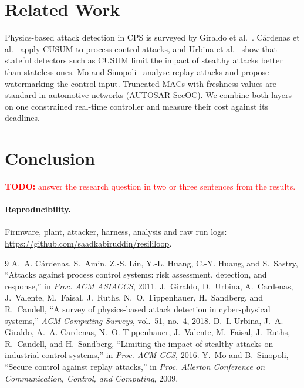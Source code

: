\documentclass[10pt,twocolumn]{article}
\newcommand{\todo}[1]{\textcolor{red}{\textbf{TODO:} #1}}
\begin{document}
\section{Related Work}
Physics-based attack detection in CPS is surveyed by Giraldo et
al.~\cite{giraldo2018}. C\'ardenas et al.~\cite{cardenas2011} apply CUSUM to
process-control attacks, and Urbina et al.~\cite{urbina2016} show that stateful
detectors such as CUSUM limit the impact of stealthy attacks better than
stateless ones. Mo and Sinopoli~\cite{mo2009} analyse replay attacks and
propose watermarking the control input. Truncated MACs with freshness values
are standard in automotive networks (AUTOSAR SecOC). We combine both layers on
one constrained real-time controller and measure their cost against its
deadlines.

\section{Conclusion}
\todo{answer the research question in two or three sentences from the results.}

\paragraph{Reproducibility.} Firmware, plant, attacker, harness, analysis and
raw run logs: \url{https://github.com/saadkabiruddin/resililoop}.

\begin{thebibliography}{9}\small
{} A.~A. C\'ardenas, S.~Amin, Z.-S. Lin, Y.-L. Huang, C.-Y. Huang,
  and S.~Sastry, ``Attacks against process control systems: risk assessment,
  detection, and response,'' in \emph{Proc. ACM ASIACCS}, 2011.
 J.~Giraldo, D.~Urbina, A.~Cardenas, J.~Valente, M.~Faisal,
  J.~Ruths, N.~O. Tippenhauer, H.~Sandberg, and R.~Candell, ``A survey of
  physics-based attack detection in cyber-physical systems,'' \emph{ACM
  Computing Surveys}, vol.~51, no.~4, 2018.
 D.~I. Urbina, J.~A. Giraldo, A.~A. Cardenas, N.~O. Tippenhauer,
  J.~Valente, M.~Faisal, J.~Ruths, R.~Candell, and H.~Sandberg, ``Limiting the
  impact of stealthy attacks on industrial control systems,'' in \emph{Proc. ACM
  CCS}, 2016.
 Y.~Mo and B.~Sinopoli, ``Secure control against replay attacks,''
  in \emph{Proc. Allerton Conference on Communication, Control, and Computing}, 2009.
\end{thebibliography}
\end{document}
